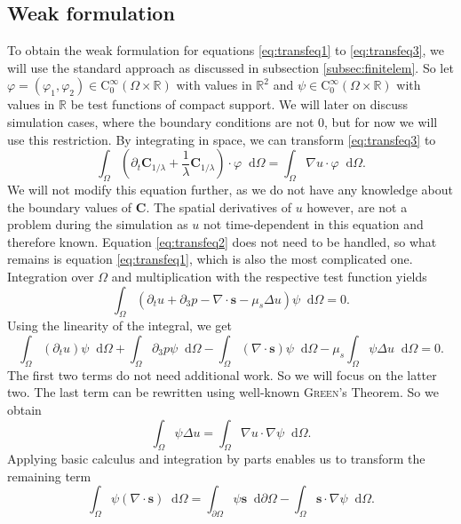 \documentclass[12pt,a4paper,twoside, open=right]{scrreprt}
\theoremstyle{definition}
\theoremstyle{plain}
\newcommand{\rr}{\mathbb{R}}
\newcommand{\bfs}{\bm{s}}
\newcommand{\bfC}{\bm{C}}
\newcommand{\D}{\mathop{}\!\mathrm{d}}
\begin{document}
\subsection{Weak formulation}
To obtain the weak formulation for equations \eqref{eq:transfeq1} to \eqref{eq:transfeq3}, we will use the standard approach as discussed in subsection \ref{subsec:finitelem}. So let $\varphi = (\varphi_1,\varphi_2)\in \mathrm{C}^\infty_0(\Omega\times\rr)$ with values in $\rr^2$ and $\psi\in \mathrm{C}^\infty_0(\Omega\times\rr)$ with values in $\rr$ be test functions of compact support. We will later on discuss simulation cases, where the boundary conditions are not 0, but for now we will use this restriction. By integrating in space, we can transform \eqref{eq:transfeq3} to 
\begin{equation}
    \int_\Omega(\partial_t\bfC_{1/\lambda}+\frac{1}{\lambda}\bfC_{1/\lambda})\cdot\varphi\D\Omega = 
   \int_\Omega \nabla u\cdot \varphi\D\Omega.
\end{equation}
We will not modify this equation further, as we do not have any knowledge about the boundary values of $\bfC$. The spatial derivatives of $u$ however, are not a problem during the simulation as $u$ not time-dependent in this equation and therefore known. Equation \eqref{eq:transfeq2} does not need to be handled, so what remains is equation \eqref{eq:transfeq1}, which is also the most complicated one. Integration over $\Omega$ and multiplication with the respective test function yields
\begin{equation}
    \int_\Omega(\partial_t u + \partial_3 p -\nabla\cdot \bfs -\mu_s\Delta u)\psi\D\Omega = 0.
\end{equation}
Using the linearity of the integral, we get
\begin{equation}
    \int_\Omega(\partial_t u)\psi\D\Omega +\int_\Omega\partial_3 p\psi\D\Omega -\int_\Omega(\nabla\cdot \bfs)\psi\D\Omega -\mu_s\int_\Omega\psi\Delta u\D\Omega=0.
\end{equation}
The first two terms do not need additional work. So we will focus on the latter two. The last term can be rewritten using well-known \textsc{Green}'s Theorem. So we obtain
\begin{equation}
    \int_\Omega \psi\Delta u = \int_\Omega\nabla u\cdot \nabla\psi\D\Omega.
\end{equation}
Applying basic calculus and integration by parts enables us to transform the remaining term
\begin{equation}
    \int_\Omega \psi(\nabla\cdot\bfs)\D\Omega =\int_{\partial\Omega}\psi\bfs\D\partial\Omega -\int_\Omega\bfs\cdot\nabla\psi\D\Omega.
\end{equation}
\end{document}
